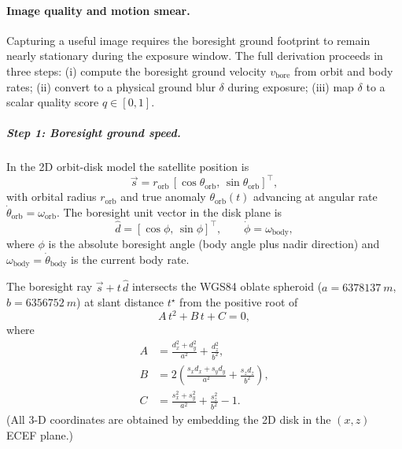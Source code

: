 \paragraph{Image quality and motion smear.}
Capturing a useful image requires the boresight ground footprint to remain nearly stationary during
the exposure window.
The full derivation proceeds in three steps: (i) compute the boresight ground velocity $v_\text{bore}$
from orbit and body rates; (ii) convert to a physical ground blur $\delta$ during exposure; (iii) map
$\delta$ to a scalar quality score $q\in[0,1]$.

\subparagraph{Step 1: Boresight ground speed.}
In the 2D orbit-disk model the satellite position is
\begin{equation}
  \vec{s} = r_\text{orb}\,[\cos\theta_\text{orb},\,\sin\theta_\text{orb}]^\top,
\end{equation}
with orbital radius $r_\text{orb}$ and true anomaly $\theta_\text{orb}(t)$ advancing at angular rate
$\dot\theta_\text{orb} = \omega_\text{orb}$.
The boresight unit vector in the disk plane is
\begin{equation}
  \hat{d} = [\cos\phi,\,\sin\phi]^\top,\qquad
  \dot\phi = \omega_\text{body},
\end{equation}
where $\phi$ is the absolute boresight angle (body angle plus nadir direction) and
$\omega_\text{body} = \dot\theta_\text{body}$ is the current body rate.

The boresight ray $\vec{s} + t\,\hat{d}$ intersects the WGS84 oblate spheroid
($a = \SI{6378137}{m}$, $b = \SI{6356752}{m}$) at slant distance $t^\star$ from the
positive root of
\begin{equation}
  A\,t^2 + B\,t + C = 0, \label{eq:ray-ellipsoid}
\end{equation}
where
\begin{align}
  A &= \frac{d_x^2 + d_y^2}{a^2} + \frac{d_z^2}{b^2}, \\
  B &= 2\!\left(\frac{s_x d_x + s_y d_y}{a^2} + \frac{s_z d_z}{b^2}\right), \\
  C &= \frac{s_x^2 + s_y^2}{a^2} + \frac{s_z^2}{b^2} - 1.
\end{align}
(All 3-D coordinates are obtained by embedding the 2D disk in the $(x,z)$ ECEF plane.)

